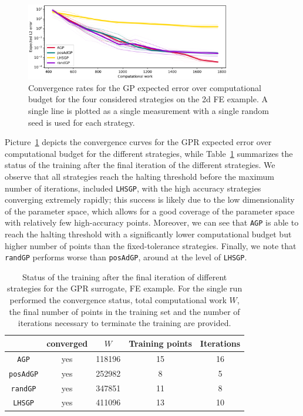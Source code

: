 \begin{figure}[H]
    \begin{center}
        \includegraphics[width=0.8\textwidth]{results/pictures/d6/GP_res.png}
    \end{center}
    \caption{Convergence rates for the GP expected error over computational budget for the four considered strategies on the 2d FE example. A single line is plotted as a single measurement with a single random seed is used for each strategy.}
        \label{fig:FE-GP-convergence}
\end{figure}

Picture~\ref{fig:FE-GP-convergence} depicts the convergence curves for the GPR expected error over computational budget for the different strategies, while Table~\ref{tab:FE-GP-recap} summarizes the status of the training after the final iteration of the different strategies.
We observe that all strategies reach the halting threshold before the maximum number of iterations, included \texttt{LHSGP}, with the high accuracy strategies converging extremely rapidly; this success is likely due to the low dimensionality of the parameter space, which allows for a good coverage of the parameter space with relatively few high-accuracy points.
Moreover, we can see that \texttt{AGP} is able to reach the halting threshold with a significantly lower computational budget but higher number of points than the fixed-tolerance strategies.
Finally, we note that \texttt{randGP} performs worse than \texttt{posAdGP}, around at the level of \texttt{LHSGP}.
\begin{table}[H]
    \begin{centering}
    \begin{tabular}{ccccc}
    \toprule
        & converged   & $W$ & Training points    & Iterations \\ 
        \midrule
        \texttt{AGP}  
        & yes & 118196 &  15   &  16  \\
        \texttt{posAdGP}
        & yes & 252982 &  8   &  5  \\
        \texttt{randGP}
        & yes & 347851 &  11   &  8  \\
        \texttt{LHSGP}
        & yes & 411096 &  13   &  10  \\
    \bottomrule
    \end{tabular}
    \caption{Status of the training after the final iteration of different strategies for the GPR surrogate, FE example. For the single run performed the convergence status, total computational work $W$, the final number of points in the training set and the number of iterations necessary to terminate the training are provided.
    }
    \label{tab:FE-GP-recap}
\end{centering}
\end{table} 

